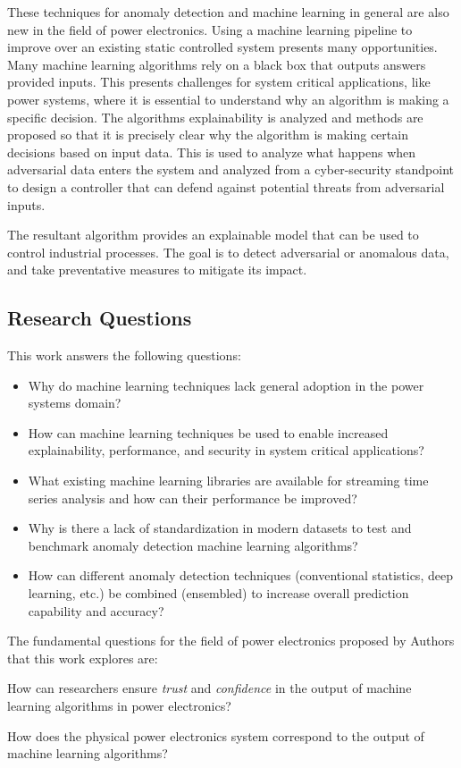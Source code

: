 These techniques for anomaly detection and machine learning in general are also new in the field of power electronics. Using a machine learning pipeline to improve over an existing static controlled system presents many opportunities. Many machine learning algorithms rely on a black box that outputs answers provided inputs. This presents challenges for system critical applications, like power systems, where it is essential to understand why an algorithm is making a specific decision. The algorithms explainability is analyzed and methods are proposed so that it is precisely clear why the algorithm is making certain decisions based on input data. This is used to analyze what happens when adversarial data enters the system and analyzed from a cyber-security standpoint to design a controller that can defend against potential threats from adversarial inputs.

The resultant algorithm provides an explainable model that can be used to control industrial processes. The goal is to detect adversarial or anomalous data, and take preventative measures to mitigate its impact.


\subsection{Research Questions}
This work answers the following questions:
\begin{itemize}
    \item Why do machine learning techniques lack general adoption in the power systems domain?
    \item How can machine learning techniques be used to enable increased explainability, performance, and security in system critical applications?
    \item What existing machine learning libraries are available for streaming time series analysis and how can their performance be improved?
    \item Why is there a lack of standardization in modern datasets to test and benchmark anomaly detection machine learning algorithms?
    \item How can different anomaly detection techniques (conventional statistics, deep learning, etc.) be combined (ensembled) to increase overall prediction capability and accuracy?
\end{itemize}

The fundamental questions for the field of power electronics proposed by Authors \cite{black-box-explainability} that this work explores are:
\begin{inlinelist}
    \item How can researchers ensure \textit{trust} and \textit{confidence} in the output of machine learning algorithms in power electronics?
    \item How does the physical power electronics system correspond to the output of machine learning algorithms?
\end{inlinelist}





